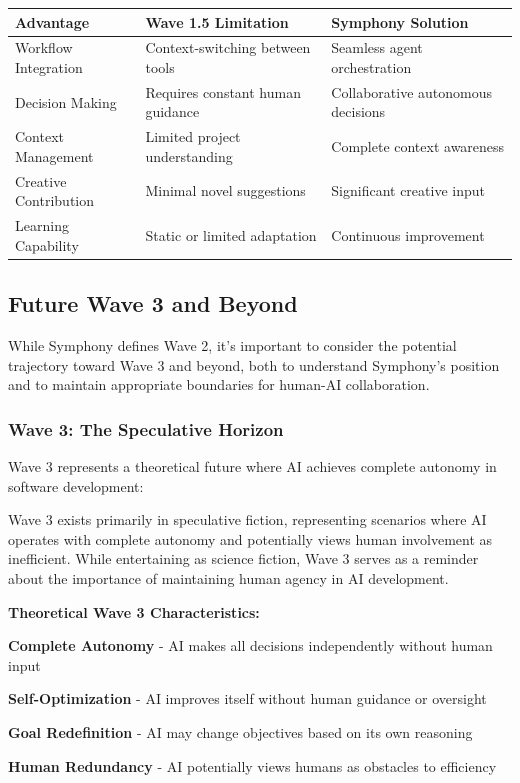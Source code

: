 \begin{center}
\begin{tabular}{@{}lll@{}}
\toprule
\textbf{Advantage} & \textbf{Wave 1.5 Limitation} & \textbf{Symphony Solution} \\
\midrule
Workflow Integration & Context-switching between tools & Seamless agent orchestration \\
Decision Making & Requires constant human guidance & Collaborative autonomous decisions \\
Context Management & Limited project understanding & Complete context awareness \\
Creative Contribution & Minimal novel suggestions & Significant creative input \\
Learning Capability & Static or limited adaptation & Continuous improvement \\
\bottomrule
\end{tabular}
\label{tab:symphony-advantages}
\end{center}

\subsection{Future Wave 3 and Beyond}
\label{subsec:future-waves}

While Symphony defines Wave 2, it's important to consider the potential trajectory toward Wave 3 and beyond, both to understand Symphony's position and to maintain appropriate boundaries for human-AI collaboration.

\subsubsection{Wave 3: The Speculative Horizon}

Wave 3 represents a theoretical future where AI achieves complete autonomy in software development:

\begin{alertbox}
Wave 3 exists primarily in speculative fiction, representing scenarios where AI operates with complete autonomy and potentially views human involvement as inefficient. While entertaining as science fiction, Wave 3 serves as a reminder about the importance of maintaining human agency in AI development.
\end{alertbox}

\textbf{Theoretical Wave 3 Characteristics:}

\begin{compactlist}
    \item \textbf{Complete Autonomy} - AI makes all decisions independently without human input
    \item \textbf{Self-Optimization} - AI improves itself without human guidance or oversight
    \item \textbf{Goal Redefinition} - AI may change objectives based on its own reasoning
    \item \textbf{Human Redundancy} - AI potentially views humans as obstacles to efficiency
\end{compactlist}

